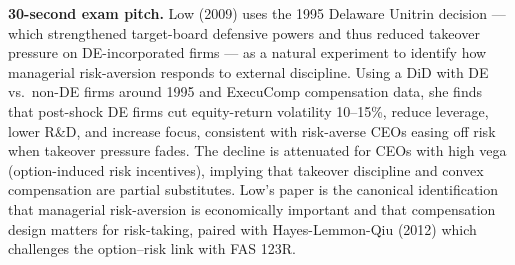 \documentclass[11pt]{article}
\begin{document}
\begin{keybox}
\textbf{30-second exam pitch.} Low (2009) uses the 1995 Delaware Unitrin decision --- which strengthened target-board defensive powers and thus reduced takeover pressure on DE-incorporated firms --- as a natural experiment to identify how managerial risk-aversion responds to external discipline. Using a DiD with DE vs.\ non-DE firms around 1995 and ExecuComp compensation data, she finds that post-shock DE firms cut equity-return volatility 10--15\%, reduce leverage, lower R\&D, and increase focus, consistent with risk-averse CEOs easing off risk when takeover pressure fades. The decline is attenuated for CEOs with high vega (option-induced risk incentives), implying that takeover discipline and convex compensation are partial substitutes. Low's paper is the canonical identification that managerial risk-aversion is economically important and that compensation design matters for risk-taking, paired with Hayes-Lemmon-Qiu (2012) which challenges the option--risk link with FAS 123R.
\end{keybox}
\end{document}
